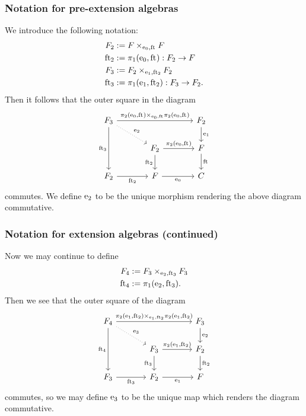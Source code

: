 \documentclass[handout]{beamer}
\begin{document}
\begin{frame}
\frametitle{Notation for pre-extension algebras}
We introduce the following notation:
\begin{align*}
\stesysf_2 
  & := \stesysff
  \\
\eft[2] 
  & := \pullbackpr{1}{\ectxext}{\eft} : \stesysf_2\to\stesysf
  \\
\stesysf_3 & := \pullback{\stesysf_2}{\stesysf_2}{\efamext}{\eft[2]}
  \\
\eft[3]
  & := \pullbackpr{1}{\efamext}{\eft[2]} : \stesysf_3\to\stesysf_2.
\end{align*}
Then it follows that the outer square in the diagram
\begin{equation*}
\begin{tikzcd}[ampersand replacement=\&,column sep=large]
\stesysf_3
  \ar[dotted]{dr}{\eext{2}}
  \ar{rr}{\pullback{\pullbackpr{2}{\ectxext}{\eft}}{\pullbackpr{2}{\ectxext}{\eft}}{\ectxext}{\eft}}
  \ar{dd}[swap]{\eft[3]}
  \& 
  \&
\stesysf_2
  \ar{d}{\efamext}
  \\
  \&
\stesysf_2
  \ar{d}[swap]{\eft[2]}
  \ar{r}{\pullbackpr{2}{\ectxext}{\eft}}
  \&
\stesysf
  \ar{d}{\eft}
  \\
\stesysf_2
  \ar{r}[swap]{\eft[2]}
  \&
\stesysf
  \ar{r}[swap]{\ectxext}
  \&
\stesysc
\end{tikzcd}
\end{equation*}
commutes. We define $\mathrm{e}_{2}$ to be the unique morphism rendering the above diagram
commutative. 
\end{frame}

\begin{frame}
\frametitle{Notation for extension algebras (continued)}
Now we may continue to define
\begin{align*}
\stesysf_4 
  & := 
\pullback{\stesysf_3}{\stesysf_3}{\eext{2}}{\eft[3]}
  \\
\eft[4] 
  & := 
\pullbackpr{1}{\eext{2}}{\eft[3]}.
\end{align*}
Then we see that the outer square of the diagram
\begin{equation*}
\begin{tikzcd}[ampersand replacement=\&,column sep=large]
\stesysf_4
  \ar[dotted]{dr}{\eext{3}}
  \ar{rr}{\pullback{\pullbackpr{2}{\efamext}{\eft[2]}}{\pullbackpr{2}{\efamext}{\eft[2]}}{\efamext}{\eft[2]}}
  \ar{dd}[swap]{\eft[4]}
  \& 
  \&
\stesysf_3
  \ar{d}{\eext{2}}
  \\
  \&
\stesysf_3
  \ar{d}[swap]{\eft[3]}
  \ar{r}{\pullbackpr{2}{\efamext}{\eft[2]}}
  \&
\stesysf_2
  \ar{d}{\eft[2]}
  \\
\stesysf_3
  \ar{r}[swap]{\eft[3]}
  \&
\stesysf_2
  \ar{r}[swap]{\efamext}
  \&
\stesysf
\end{tikzcd}
\end{equation*}
commutes,
so we may define $\mathrm{e}_{3}$ to be the unique map which renders the diagram commutative.
\end{frame}
\end{document}
